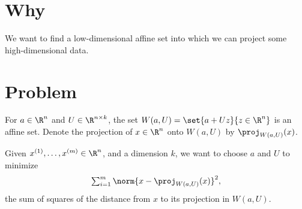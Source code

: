 
\section*{Why}

We want to find a low-dimensional affine set into which we can project some high-dimensional data.

\section*{Problem}

For $a \in \R ^n$ and $U \in \R ^{n \times k}$, the set $W(a, U) = \set{a + Uz}{z \in \R ^n}$ is an affine set.
Denote the projection of $x \in \R ^n$ onto $W(a, U)$ by $\proj_{W(a, U)}(x)$.

Given $x^{(1)}, \dots , x^{(m)} \in \R ^n$, and a dimension $k$, we want to choose $a$ and $U$ to minimize
  \[
\textstyle
\sum_{i = 1}^{m} \norm{x - \proj_{W(a, U)}(x)}^2,
  \]
the sum of squares of the distance from $x$ to its projection in $W(a, U)$.

\blankpage